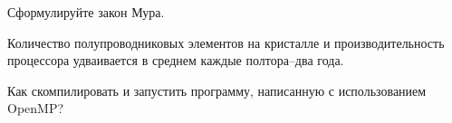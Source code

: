\documentclass[a4paper, 12pt, addpoints]{exam}
\begin{document}
\begin{questions}
\question[3] Сформулируйте закон Мура.
\begin{solution}[2cm]
Количество полупроводниковых элементов на кристалле и
производительность процессора удваивается в среднем каждые
полтора–два года.
\end{solution}

\question[3] Как скомпилировать и запустить программу, написанную с использованием OpenMP?
\begin{solution}[2cm]
\end{solution}



\end{questions}
\end{document}
